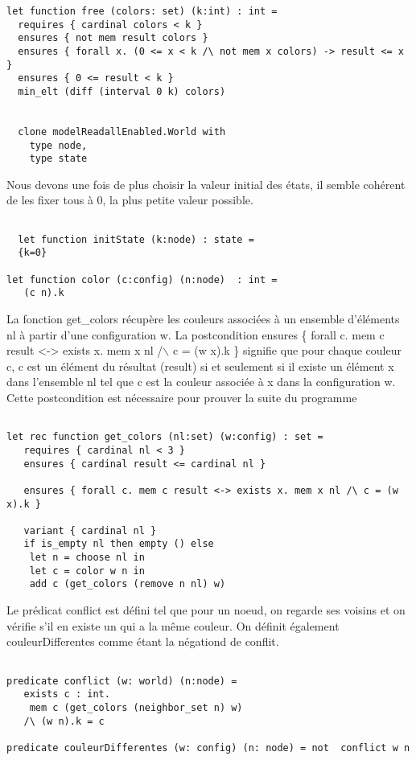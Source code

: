 \documentclass[11pt]{article}
\begin{document}
\begin{verbatim}
let function free (colors: set) (k:int) : int =
  requires { cardinal colors < k }
  ensures { not mem result colors }
  ensures { forall x. (0 <= x < k /\ not mem x colors) -> result <= x }
  ensures { 0 <= result < k }
  min_elt (diff (interval 0 k) colors)


  clone modelReadallEnabled.World with
    type node,
    type state

\end{verbatim}

Nous devons une fois de plus choisir la valeur initial des états, il semble cohérent de les fixer tous à 0, la plus petite valeur possible.

\begin{verbatim}

  let function initState (k:node) : state =
  {k=0}

let function color (c:config) (n:node)  : int =
   (c n).k

\end{verbatim}

La fonction get\_colors récupère les couleurs associées à un ensemble d'éléments nl à partir d'une configuration w. 
La postcondition ensures \{ forall c. mem c result <-> exists x. mem x nl /$\backslash$ c = (w x).k \} signifie
que pour chaque couleur c, c est un élément du résultat (result) si et seulement si 
il existe un élément x dans l'ensemble nl tel que c est la couleur associée à x dans la configuration w.
Cette postcondition est nécessaire pour prouver la suite du programme

\begin{verbatim}

let rec function get_colors (nl:set) (w:config) : set =
   requires { cardinal nl < 3 }
   ensures { cardinal result <= cardinal nl }

   ensures { forall c. mem c result <-> exists x. mem x nl /\ c = (w x).k }

   variant { cardinal nl }
   if is_empty nl then empty () else
    let n = choose nl in
    let c = color w n in
    add c (get_colors (remove n nl) w)

\end{verbatim}

Le prédicat conflict est défini tel que pour un noeud, on regarde ses voisins et on vérifie s'il en existe un qui a la même couleur.
On définit également couleurDifferentes comme étant la négationd de conflit. 

\begin{verbatim}

predicate conflict (w: world) (n:node) =
   exists c : int.
    mem c (get_colors (neighbor_set n) w)
   /\ (w n).k = c

predicate couleurDifferentes (w: config) (n: node) = not  conflict w n

\end{verbatim}
\end{document}
